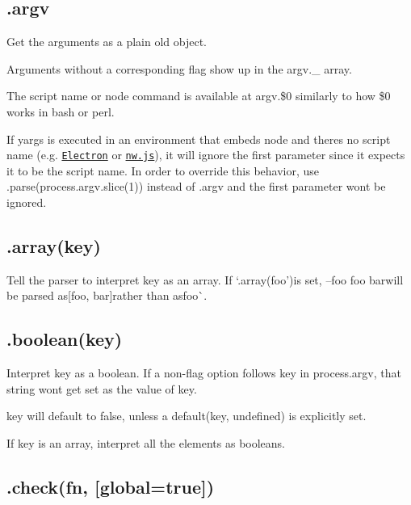 \subsection*{.argv }

Get the arguments as a plain old object.

Arguments without a corresponding flag show up in the {\ttfamily argv.\+\_\+} array.

The script name or node command is available at {\ttfamily argv.\$0} similarly to how {\ttfamily \$0} works in bash or perl.

If {\ttfamily yargs} is executed in an environment that embeds node and there\textquotesingle{}s no script name (e.\+g. \href{http://electron.atom.io/}{\tt Electron} or \href{http://nwjs.io/}{\tt nw.\+js}), it will ignore the first parameter since it expects it to be the script name. In order to override this behavior, use {\ttfamily .parse(process.\+argv.\+slice(1))} instead of {\ttfamily .argv} and the first parameter won\textquotesingle{}t be ignored.

\subsection*{\label{_array}%
.array(key) }

Tell the parser to interpret {\ttfamily key} as an array. If `.array(\textquotesingle{}foo'){\ttfamily is set, }--foo foo bar{\ttfamily will be parsed as}\mbox{[}\textquotesingle{}foo\textquotesingle{}, \textquotesingle{}bar\textquotesingle{}\mbox{]}{\ttfamily rather than as}\textquotesingle{}foo\textquotesingle{}\`{}.

\subsection*{\label{_boolean}%
.boolean(key) }

Interpret {\ttfamily key} as a boolean. If a non-\/flag option follows {\ttfamily key} in {\ttfamily process.\+argv}, that string won\textquotesingle{}t get set as the value of {\ttfamily key}.

{\ttfamily key} will default to {\ttfamily false}, unless a {\ttfamily default(key, undefined)} is explicitly set.

If {\ttfamily key} is an array, interpret all the elements as booleans.

\subsection*{.check(fn, \mbox{[}global=true\mbox{]}) }

